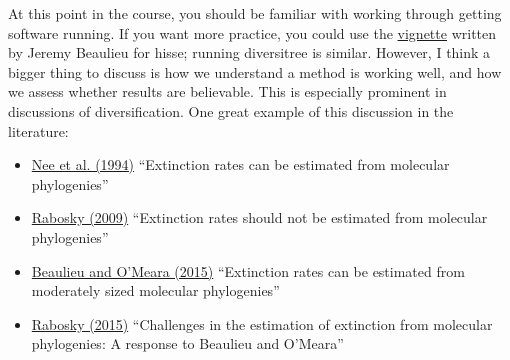 \documentclass[]{article}
\providecommand{\tightlist}{%
  \setlength{\itemsep}{0pt}\setlength{\parskip}{0pt}}
\theoremstyle{definition}
\theoremstyle{definition}
\theoremstyle{definition}
\theoremstyle{remark}
\begin{document}
At this point in the course, you should be familiar with working through
getting software running. If you want more practice, you could use the
\href{https://cran.r-project.org/web/packages/hisse/vignettes/hisse-vignette.html}{vignette}
written by Jeremy Beaulieu for hisse; running diversitree is similar.
However, I think a bigger thing to discuss is how we understand a method
is working well, and how we assess whether results are believable. This
is especially prominent in discussions of diversification. One great
example of this discussion in the literature:

\begin{itemize}
\tightlist
\item
  \href{http://rstb.royalsocietypublishing.org/content/344/1307/77}{Nee
  et al. (1994)} ``Extinction rates can be estimated from molecular
  phylogenies''
\item
  \href{http://onlinelibrary.wiley.com/doi/10.1111/j.1558-5646.2009.00926.x/abstract}{Rabosky
  (2009)} ``Extinction rates should not be estimated from molecular
  phylogenies''
\item
  \href{http://onlinelibrary.wiley.com/doi/10.1111/evo.12614/abstract}{Beaulieu
  and O'Meara (2015)} ``Extinction rates can be estimated from
  moderately sized molecular phylogenies''
\item
  \href{http://onlinelibrary.wiley.com/doi/10.1111/evo.12820/full}{Rabosky
  (2015)} ``Challenges in the estimation of extinction from molecular
  phylogenies: A response to Beaulieu and O'Meara''
\end{itemize}
\end{document}
